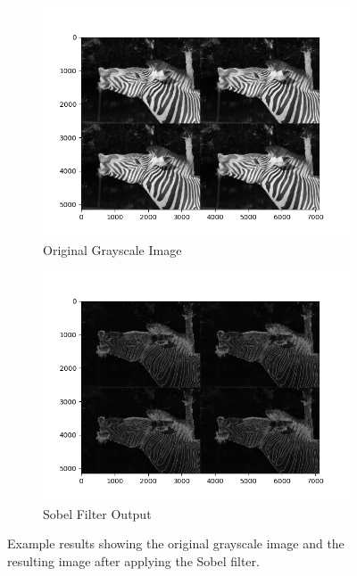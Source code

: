 \begin{figure}[h]
    \centering
    \begin{subfigure}{0.45\textwidth}
        \centering
        \includegraphics[width=\textwidth]{images/grayscale.png}
        \caption{Original Grayscale Image}
        \label{fig:grayscale}
    \end{subfigure}
    \hfill
    \begin{subfigure}{0.45\textwidth}
        \centering
        \includegraphics[width=\textwidth]{images/sobel_output.png}
        \caption{Sobel Filter Output}
        \label{fig:sobel-output}
    \end{subfigure}
    \caption{Example results showing the original grayscale image and the resulting image after applying the Sobel filter.}
    \label{fig:example-results}
\end{figure}

